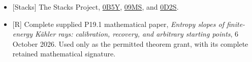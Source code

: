 \documentclass[
  11pt,
]{article}
\begin{document}
\begin{itemize}
{  Monge--Ampère equations with prescribed singularity},
  \href{https://arxiv.org/pdf/1705.05796v3}{arXiv:1705.05796v3}, Theorem
  2.4.
\item
  {[}Stacks{]} The Stacks Project,
  \href{https://stacks.math.columbia.edu/tag/0B5Y}{0B5Y},
  \href{https://stacks.math.columbia.edu/tag/09MS}{09MS}, and
  \href{https://stacks.math.columbia.edu/tag/0D2S}{0D2S}.
\item
  {[}R{]} Complete supplied P19.1 mathematical paper, \emph{Entropy
  slopes of finite-energy Kähler rays: calibration, recovery, and
  arbitrary starting points}, 6 October 2026. Used only as the permitted
  theorem grant, with its complete retained mathematical signature.
\end{itemize}
\end{document}
